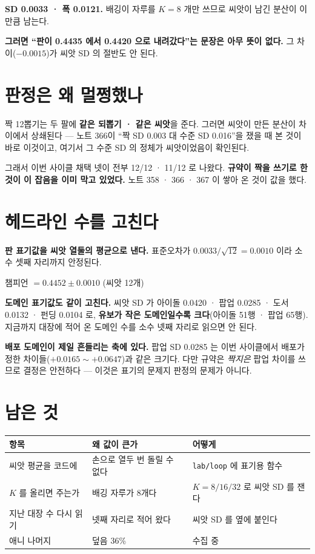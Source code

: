 \documentclass[11pt]{article}
\begin{document}
\textbf{SD 0.0033 · 폭 0.0121.} 배깅이 자루를 $K{=}8$ 개만 쓰므로 씨앗이
남긴 분산이 이만큼 남는다.

\textbf{그러면 ``판이 0.4435 에서 0.4420 으로 내려갔다''는 문장은 아무
뜻이 없다.} 그 차이($-0.0015$)가 씨앗 SD 의 절반도 안 된다.

\section{판정은 왜 멀쩡했나}

짝 12뽑기는 두 팔에 \textbf{같은 되뽑기 · 같은 씨앗}을 준다. 그러면 씨앗이
만든 분산이 차이에서 상쇄된다 --- 노트 366이 ``짝 SD 0.003 대 수준 SD
0.016''을 쟀을 때 본 것이 바로 이것이고, 여기서 그 수준 SD 의 정체가
씨앗이었음이 확인된다.

그래서 이번 사이클 채택 넷이 전부 12/12 · 11/12 로 나왔다. \textbf{규약이
짝을 쓰기로 한 것이 이 잡음을 이미 막고 있었다.} 노트 358 · 366 · 367 이
쌓아 온 것이 값을 했다.

\section{헤드라인 수를 고친다}

\textbf{판 표기값을 씨앗 열둘의 평균으로 낸다.} 표준오차가
$0.0033/\sqrt{12} = 0.0010$ 이라 소수 셋째 자리까지 안정된다.

\begin{center}
챔피언 $= \mathbf{0.4452 \pm 0.0010}$ (씨앗 12개) \quad
[한 씨앗으로 내면 0.4420]
\end{center}

\textbf{도메인 표기값도 같이 고친다.} 씨앗 SD 가 아이돌 0.0420 · 팝업
0.0285 · 도서 0.0132 · 펀딩 0.0104 로, \textbf{유보가 작은 도메인일수록
크다}(아이돌 51행 · 팝업 65행). 지금까지 대장에 적어 온 도메인 수를
소수 넷째 자리로 읽으면 안 된다.

\textbf{배포 도메인이 제일 흔들리는 축에 있다.} 팝업 SD 0.0285 는 이번
사이클에서 배포가 정한 차이들($+0.0165 \sim +0.0647$)과 같은 크기다.
다만 규약은 \emph{짝지은} 팝업 차이를 쓰므로 결정은 안전하다 --- 이것은
표기의 문제지 판정의 문제가 아니다.

\section{남은 것}

\begin{center}
\begin{tabular}{lll}
\hline
항목 & 왜 값이 큰가 & 어떻게 \\
\hline
씨앗 평균을 코드에 & 손으로 열두 번 돌릴 수 없다 & \texttt{lab/loop} 에 표기용 함수 \\
$K$ 를 올리면 주는가 & 배깅 자루가 8개다 & $K{=}8/16/32$ 로 씨앗 SD 를 잰다 \\
지난 대장 수 다시 읽기 & 넷째 자리로 적어 왔다 & 씨앗 SD 를 옆에 붙인다 \\
애니 나머지 & 덮음 36\% & 수집 중 \\
\hline
\end{tabular}
\end{center}
\end{document}

